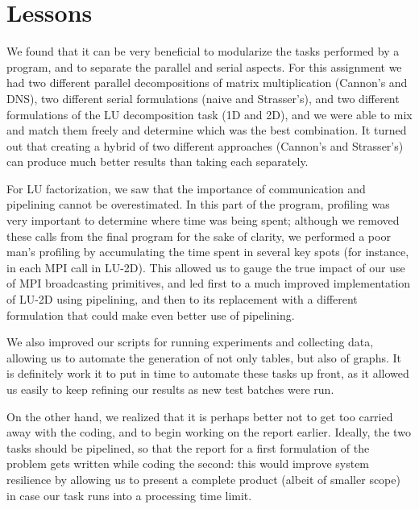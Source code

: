 \documentclass{article}
\begin{document}
\section{Lessons}

We found that it can be very beneficial to modularize the tasks performed by a program, and to separate the parallel and serial aspects. For this assignment we had two different parallel decompositions of matrix multiplication (Cannon's and DNS), two different serial formulations (naive and Strasser's), and two different formulations of the LU decomposition task (1D and 2D), and we were able to mix and match them freely and determine which was the best combination. It turned out that creating a hybrid of two different approaches (Cannon's and Strasser's) can produce much better results than taking each separately.

For LU factorization, we saw that the importance of communication and pipelining cannot be overestimated. In this part of the program, profiling was very important to determine where time was being spent; although we removed these calls from the final program for the sake of clarity, we performed a poor man's profiling by accumulating the time spent in several key spots (for instance, in each MPI call in LU-2D). This allowed us to gauge the true impact of our use of MPI broadcasting primitives, and led first to a much improved implementation of LU-2D using pipelining, and then to its replacement with a different formulation that could make even better use of pipelining.

We also improved our scripts for running experiments and collecting data, allowing us to automate the generation of not only tables, but also of graphs. It is definitely work it to put in time to automate these tasks up front, as it allowed us easily to keep refining our results as new test batches were run.

On the other hand, we realized that it is perhaps better not to get too carried away with the coding, and to begin working on the report earlier. Ideally, the two tasks should be pipelined, so that the report for a first formulation of the problem gets written while coding the second: this would improve system resilience by allowing us to present a complete product (albeit of smaller scope) in case our task runs into a processing time limit.


\clearpage

\appendix








\end{document}
